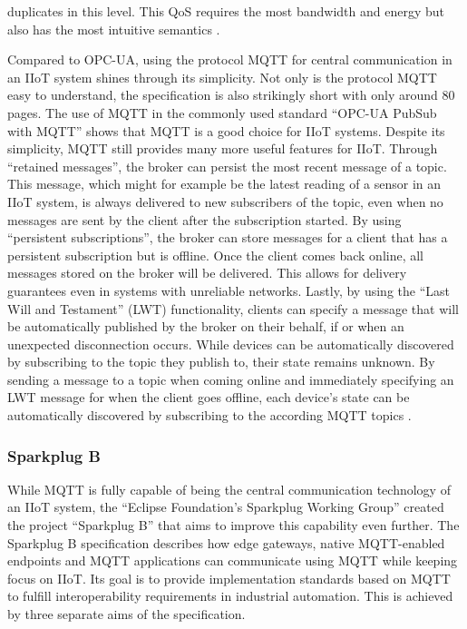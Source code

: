 duplicates in this level. This QoS requires the most bandwidth and energy but also has the most intuitive semantics \cite{hivemq_opcua_vs_mqtt_sparkplug}.\newline
        
        Compared to OPC-UA, using the protocol MQTT for central communication in an IIoT system shines through its simplicity. Not only is the protocol MQTT easy to understand, the specification is also strikingly short with only around 80 pages. The use of MQTT in the commonly used standard ``OPC-UA PubSub with MQTT'' shows that MQTT is a good choice for IIoT systems. Despite its simplicity, MQTT still provides many more useful features for IIoT. Through ``retained messages'', the broker can persist the most recent message of a topic. This message, which might for example be the latest reading of a sensor in an IIoT system, is always delivered to new subscribers of the topic, even when no messages are sent by the client after the subscription started. By using ``persistent subscriptions'', the broker can store messages for a client that has a persistent subscription but is offline. Once the client comes back online, all messages stored on the broker will be delivered. This allows for delivery guarantees even in systems with unreliable networks. Lastly, by using the ``Last Will and Testament'' (LWT) functionality, clients can specify a message that will be automatically published by the broker on their behalf, if or when an unexpected disconnection occurs. While devices can be automatically discovered by subscribing to the topic they publish to, their state remains unknown. By sending a message to a topic when coming online and immediately specifying an LWT message for when the client goes offline, each device's state can be automatically discovered by subscribing to the according MQTT topics \cite{hivemq_opcua_vs_mqtt_sparkplug}.
        
    \subsubsection{Sparkplug B}
    \label{subsubsection:sparkplug-b}
    
        While MQTT is fully capable of being the central communication technology of an IIoT system, the ``Eclipse Foundation's Sparkplug Working Group'' created the project ``Sparkplug B'' that aims to improve this capability even further. The Sparkplug B specification describes how edge gateways, native MQTT-enabled endpoints and MQTT applications can communicate using MQTT while keeping focus on IIoT. Its goal is to provide implementation standards based on MQTT to fulfill interoperability requirements in industrial automation. This is achieved by three separate aims of the specification. 
        
